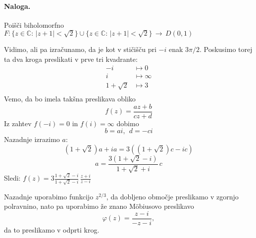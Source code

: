 \documentclass[a4paper]{article}
\newcommand{\C}{\mathbb{C}}
\begin{document}
\paragraph{Naloga.} Poišči biholomorfno $F:\{z\in\C\colon\,\left|z+1\right|<\sqrt{2}\}\cup\{z\in\C\colon\,\left|z+1\right|<\sqrt{2}\}\,\to\,D(0,1)$ \\
\begin{figure}[h!]
    \centering
\end{figure}
\newline
Vidimo, ali pa izračunamo, da je kot v stičišču pri $-i$ enak $3\pi/2$. Poskusimo torej ta dva kroga preslikati v prve tri kvadrante:
\begin{align*}
    -i & \mapsto 0 \\
    i & \mapsto \infty \\
    1 + \sqrt{2} & \mapsto 3 \\
\end{align*}
Vemo, da bo imela takšna preslikava obliko
$$f(z) = \frac{az + b}{cz + d}$$
Iz zahtev $f(-i) = 0$ in $f(i) = \infty$ dobimo
$$b = ai,~~d = -ci$$
Nazadnje izrazimo $a$:
$$(1 + \sqrt{2})a + ia = 3((1 + \sqrt{2})c - ic)$$
$$a = \frac{3(1 + \sqrt{2} - i)}{1 + \sqrt{2} + i}\,c$$
Sledi: $\displaystyle{f(z) = 3\frac{1 + \sqrt{2} - i}{1 + \sqrt{2} - i} \,\frac{z + i}{z - i}}$
\newline
\begin{figure}[h!]
    \centering
\end{figure}
\newline
Nazadnje uporabimo funkcijo $z^{2/3}$, da dobljeno območje preslikamo v zgornjo polravnino, nato pa uporabimo že znano Möbiusovo preslikavo
$$\varphi(z) = \frac{z - i}{- z - i},$$
da to preslikamo v odprti krog.
\newpage
\end{document}
